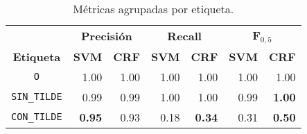 \documentclass[runningheads,a4paper]{llncs}
\begin{document}
\begin{table}[ht]
 	\renewcommand{\arraystretch}{1.3}
	\renewcommand{\tabcolsep}{3pt}
	\caption{Métricas agrupadas por etiqueta.}
	\label{table:metricas-generales}
	\centering
	\begin{tabular}{c r r r r r r}
		\hline
		\multicolumn{1}{c}{} 
			& \multicolumn{2}{c}{\textbf{Precisión}} 
			& \multicolumn{2}{c}{\textbf{Recall}} 
			& \multicolumn{2}{c}{\textbf{F$_{0,5}$}} \\
		\multicolumn{1}{c}{\textbf{Etiqueta}} 
			& \multicolumn{1}{r}{\textbf{SVM}} & \multicolumn{1}{r}{\textbf{CRF}}
			& \multicolumn{1}{r}{\textbf{SVM}} & \multicolumn{1}{r}{\textbf{CRF}}
			& \multicolumn{1}{r}{\textbf{SVM}} & \multicolumn{1}{r}{\textbf{CRF}} \\
		\hline\hline
		\texttt{O} 		& 1.00 	& 1.00			& 1.00 & 1.00 			& 1.00 & 1.00 \\
		\texttt{SIN\_TILDE} 	& 0.99 & 0.99 			& 1.00 & 1.00 			& 0.99 & \textbf{1.00} \\
		\texttt{CON\_TILDE} 	& \textbf{0.95} & 0.93 	& 0.18 & \textbf{0.34} 	& 0.31 & \textbf{0.50} \\
		\hline
	\end{tabular}
\end{table}
\end{document}
